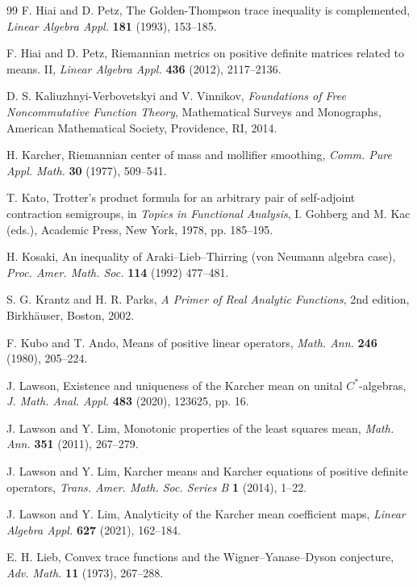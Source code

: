 \documentclass[11pt,reqno]{article}
\numberwithin{equation}{section}
\begin{document}
\begin{thebibliography}{99}
F. Hiai and D. Petz,
The Golden-Thompson trace inequality is complemented,
{\it Linear Algebra Appl.} {\bf 181} (1993), 153--185.

F. Hiai and D. Petz, Riemannian metrics on positive definite matrices related to means. II,
{\it Linear Algebra Appl.} {\bf 436} (2012), 2117--2136.

D. S. Kaliuzhnyi-Verbovetskyi and V. Vinnikov, {\it Foundations of Free Noncommutative
Function Theory}, Mathematical Surveys and Monographs, American Mathematical Society,
Providence, RI, 2014.

H. Karcher, Riemannian center of mass and mollifier smoothing,
{\it Comm. Pure Appl. Math.} {\bf 30} (1977), 509--541.

T. Kato, Trotter's product formula for an arbitrary pair of self-adjoint contraction semigroups, in
{\it Topics in Functional Analysis}, I. Gohberg and M. Kac (eds.), Academic Press, New York, 1978,
pp. 185--195.


H. Kosaki, An inequality of Araki--Lieb--Thirring (von Neumann algebra case),
{\it Proc. Amer. Math. Soc.} {\bf 114} (1992) 477--481.

S. G. Krantz and H. R. Parks, {\it A Primer of Real Analytic Functions}, 2nd edition,
Birkh\"auser, Boston, 2002.

F. Kubo and T. Ando, Means of positive linear operators, {\it Math. Ann.} {\bf 246} (1980), 205--224.

J. Lawson, Existence and uniqueness of the Karcher mean on unital $C^*$-algebras,
{\it J. Math. Anal. Appl.} {\bf 483} (2020), 123625, pp. 16.

J. Lawson and Y. Lim, Monotonic properties of the least squares mean,
{\it Math. Ann.} {\bf 351} (2011), 267--279.

J. Lawson and Y. Lim, Karcher means and Karcher equations of positive definite operators,
{\it Trans. Amer. Math. Soc. Series B} {\bf 1} (2014), 1--22.

J. Lawson and Y. Lim, Analyticity of the Karcher mean coefficient maps,
{\it Linear Algebra Appl.} {\bf 627} (2021), 162--184.

E. H. Lieb, Convex trace functions and the Wigner--Yanase--Dyson conjecture,
{\it Adv. Math.} {\bf 11} (1973), 267--288.


\end{thebibliography}
\end{document}
